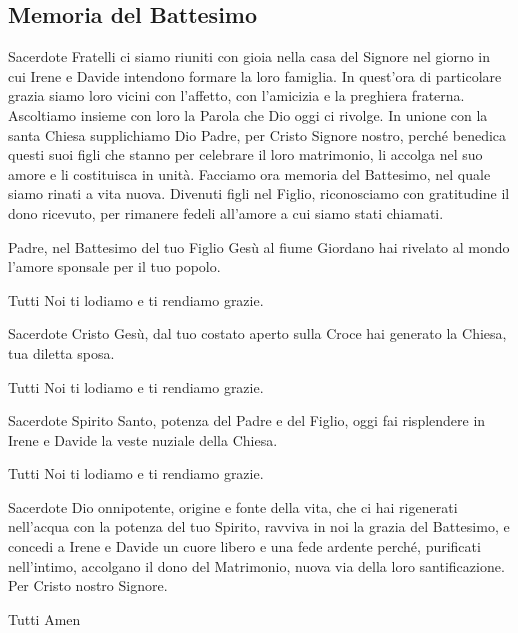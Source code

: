 
\subsection*{Memoria del Battesimo}

\begin{dialoghi}
\item[Sacerdote] Fratelli ci siamo riuniti con gioia nella casa del Signore nel giorno in cui Irene e Davide intendono formare la loro famiglia. In quest'ora di particolare grazia siamo loro vicini con l'affetto, con l'amicizia e la preghiera fraterna. Ascoltiamo insieme con loro la Parola che Dio oggi ci rivolge. In unione con la santa Chiesa supplichiamo Dio Padre, per Cristo Signore nostro, perché benedica questi suoi figli che stanno per celebrare il loro matrimonio, li accolga nel suo amore e li costituisca in unità. Facciamo ora memoria del Battesimo, nel quale siamo rinati a vita nuova. Divenuti figli nel Figlio, riconosciamo con gratitudine il dono ricevuto, per rimanere fedeli all'amore a cui siamo stati chiamati.

Padre, nel Battesimo del tuo Figlio Gesù al fiume Giordano hai rivelato al mondo l'amore sponsale per il tuo popolo.
\item[Tutti] Noi ti lodiamo e ti rendiamo grazie.
\item[Sacerdote] Cristo Gesù, dal tuo costato aperto sulla Croce hai generato la Chiesa, tua diletta sposa.
\item[Tutti] Noi ti lodiamo e ti rendiamo grazie.
\item[Sacerdote] Spirito Santo, potenza del Padre e del Figlio, oggi fai risplendere in Irene e Davide la veste nuziale della Chiesa.
\item[Tutti] Noi ti lodiamo e ti rendiamo grazie.
\item[Sacerdote] Dio onnipotente, origine e fonte della vita, che ci hai rigenerati nell'acqua con la potenza del tuo Spirito, ravviva in noi la grazia del Battesimo, e concedi a Irene e Davide un cuore libero e una fede ardente perché, purificati nell'intimo, accolgano il dono del Matrimonio, nuova via della loro santificazione. Per Cristo nostro Signore.
\item[Tutti] Amen
\end{dialoghi}

\newpage